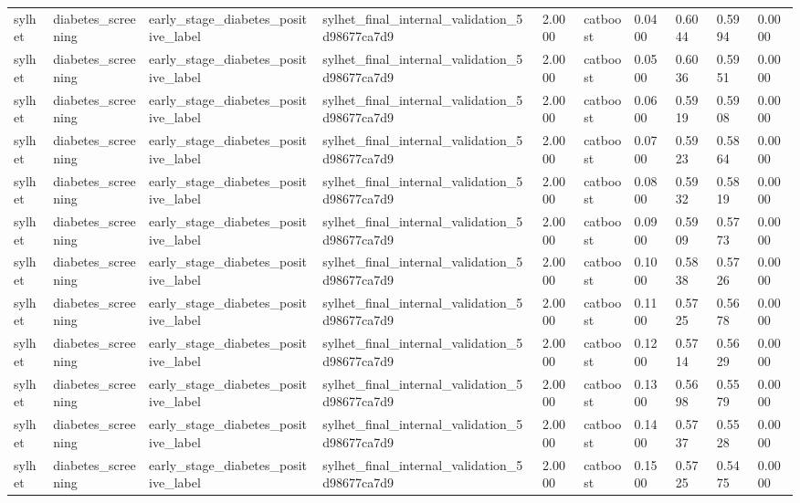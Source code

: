 \begin{tabular}{llllllllll}
sylhet & diabetes\_screening & early\_stage\_diabetes\_positive\_label & sylhet\_final\_internal\_validation\_5d98677ca7d9 & 2.0000 & catboost & 0.0400 & 0.6044 & 0.5994 & 0.0000 \\
sylhet & diabetes\_screening & early\_stage\_diabetes\_positive\_label & sylhet\_final\_internal\_validation\_5d98677ca7d9 & 2.0000 & catboost & 0.0500 & 0.6036 & 0.5951 & 0.0000 \\
sylhet & diabetes\_screening & early\_stage\_diabetes\_positive\_label & sylhet\_final\_internal\_validation\_5d98677ca7d9 & 2.0000 & catboost & 0.0600 & 0.5919 & 0.5908 & 0.0000 \\
sylhet & diabetes\_screening & early\_stage\_diabetes\_positive\_label & sylhet\_final\_internal\_validation\_5d98677ca7d9 & 2.0000 & catboost & 0.0700 & 0.5923 & 0.5864 & 0.0000 \\
sylhet & diabetes\_screening & early\_stage\_diabetes\_positive\_label & sylhet\_final\_internal\_validation\_5d98677ca7d9 & 2.0000 & catboost & 0.0800 & 0.5932 & 0.5819 & 0.0000 \\
sylhet & diabetes\_screening & early\_stage\_diabetes\_positive\_label & sylhet\_final\_internal\_validation\_5d98677ca7d9 & 2.0000 & catboost & 0.0900 & 0.5909 & 0.5773 & 0.0000 \\
sylhet & diabetes\_screening & early\_stage\_diabetes\_positive\_label & sylhet\_final\_internal\_validation\_5d98677ca7d9 & 2.0000 & catboost & 0.1000 & 0.5838 & 0.5726 & 0.0000 \\
sylhet & diabetes\_screening & early\_stage\_diabetes\_positive\_label & sylhet\_final\_internal\_validation\_5d98677ca7d9 & 2.0000 & catboost & 0.1100 & 0.5725 & 0.5678 & 0.0000 \\
sylhet & diabetes\_screening & early\_stage\_diabetes\_positive\_label & sylhet\_final\_internal\_validation\_5d98677ca7d9 & 2.0000 & catboost & 0.1200 & 0.5714 & 0.5629 & 0.0000 \\
sylhet & diabetes\_screening & early\_stage\_diabetes\_positive\_label & sylhet\_final\_internal\_validation\_5d98677ca7d9 & 2.0000 & catboost & 0.1300 & 0.5698 & 0.5579 & 0.0000 \\
sylhet & diabetes\_screening & early\_stage\_diabetes\_positive\_label & sylhet\_final\_internal\_validation\_5d98677ca7d9 & 2.0000 & catboost & 0.1400 & 0.5737 & 0.5528 & 0.0000 \\
sylhet & diabetes\_screening & early\_stage\_diabetes\_positive\_label & sylhet\_final\_internal\_validation\_5d98677ca7d9 & 2.0000 & catboost & 0.1500 & 0.5725 & 0.5475 & 0.0000 \\

\end{tabular}
